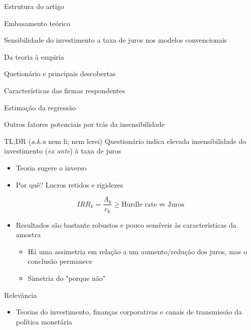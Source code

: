\documentclass[presentation]{beamer}
\begin{document}
\begin{frame}[label={sec:org71da50e}]{Estrutura do artigo}
\begin{block}{Embasamento teórico}
\begin{block}{Sensibilidade do investimento a taxa de juros nos modelos convencionais}
\end{block}
\begin{block}{Da teoria à empiria}
\end{block}
\end{block}
\begin{block}{Quetionário e principais descobertas}
\end{block}
\begin{block}{Características das firmas respondentes}
\end{block}
\begin{block}{Estimação da regressão}
\end{block}
\begin{block}{Outros fatores potenciais por trás da insensibilidade}
\end{block}
\end{frame}
\begin{frame}[label={sec:org4414570}]{TL;DR (\emph{a.k.a} nem li; nem lerei)}
Questionário indica elevada \alert{insensibilidade} do investimento (\emph{ex ante}) à taxa de juros
\begin{itemize}
\item Teoria sugere o inverso
\item Por quê? Lucros retidos e rigidezes
\end{itemize}

$$
IRR_{k} = \frac{A_{k}}{c_{k}} \geq \text{Hurdle rate} \nRightarrow \text{Juros}
$$

\begin{itemize}
\item Resultados são bastante robustos e pouco sensíveis às características da amostra
\begin{itemize}
\item Há uma assimetria em relação a um aumento/redução dos juros, mas o conclusão permanece
\item Simetria do "porque não"
\end{itemize}
\end{itemize}

\begin{block}{Relevância}
\begin{itemize}
\item Teorias do investimento, finanças corporativas e canais de transmissão da política monetária
\end{itemize}
\end{block}
\end{frame}
\end{document}
